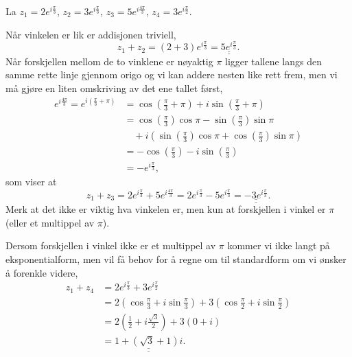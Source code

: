 \documentclass[a4paper,norsk,12pt]{article}
\newcommand{\ans}[1]{\underline{\underline{#1}}}
\newcounter{exa}
\begin{document}
\begin{texample}
	La $z_1 = 2 e^{i\frac{\pi}{3}}$, $z_2 = 3e^{i\frac{\pi}{3}}$, $z_3 = 5e^{i\frac{4\pi}{3}}$, $z_4 = 3e^{i\frac{\pi}{2}}$.

	Når vinkelen er lik er addisjonen triviell,
	\begin{displaymath}
		z_1 + z_2 = (2 + 3) e^{i\frac{\pi}{3}} = \ans{5e^{i\frac{\pi}{3}}}.
	\end{displaymath}
	Når forskjellen mellom de to vinklene er nøyaktig $\pi$ ligger tallene langs den samme rette linje gjennom origo og vi kan addere nesten like rett frem, men vi må gjøre en liten omskriving av det ene tallet først,
	\begin{align*}
	e^{i\frac{4\pi}{3}} = e^{i\left(\frac{\pi}{3}+\pi\right)} &= \cos\left(\frac{\pi}{3}+\pi\right) + i\sin\left(\frac{\pi}{3}+\pi\right)\\
	&= \cos\left(\frac{\pi}{3}\right)\cos\pi - \sin\left(\frac{\pi}{3}\right)\sin\pi \\
	&\quad+ i\left(\sin\left(\frac{\pi}{3}\right)\cos\pi + \cos\left(\frac{\pi}{3}\right)\sin\pi\right) \\
	&= -\cos\left(\frac{\pi}{3}\right)-i\sin\left(\frac{\pi}{3}\right) \\
	&= -e^{i\frac{\pi}{3}},
	\end{align*}
	som viser at
	\begin{displaymath}
		z_1 + z_3 = 2e^{i\frac{\pi}{3}} + 5e^{i\frac{4\pi}{3}} = 2e^{i\frac{\pi}{3}} - 5e^{i\frac{\pi}{3}} = \ans{-3e^{i\frac{\pi}{3}}}.
	\end{displaymath}
	Merk at det ikke er viktig hva vinkelen er, men kun at forskjellen i vinkel er $\pi$ (eller et multippel av $\pi$).

	Dersom forskjellen i vinkel ikke er et multippel av $\pi$ kommer vi ikke langt på eksponentialform, men vil få behov for å regne om til standardform om vi ønsker å forenkle videre,
	\begin{align*}
		z_1 + z_4 &= 2 e^{i\frac{\pi}{3}} + 3e^{i\frac{\pi}{2}} \\
		&= 2\left(\cos\frac{\pi}{3}+i\sin\frac{\pi}{3}\right) + 3\left(\cos\frac{\pi}{2}+i\sin\frac{\pi}{2}\right) \\
		&= 2\left(\frac12+i\frac{\sqrt{3}}{2}\right) + 3\left(0 + i\right) \\
		&= \ans{1 +\left(\sqrt{3}+1\right)i}.
	\end{align*}
\end{texample}
\end{document}
